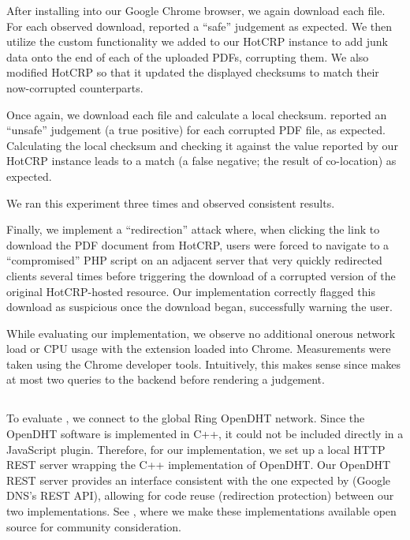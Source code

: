 After installing \DNSSYS{} into our Google Chrome browser, we again download
each file. For each observed download, \DNSSYS{} reported a ``safe'' judgement
as expected. We then utilize the custom functionality we added to our HotCRP
instance to add junk data onto the end of each of the uploaded PDFs, corrupting
them. We also modified HotCRP so that it updated the displayed checksums to
match their now-corrupted counterparts.

Once again, we download each file and calculate a local checksum. \DNSSYS{}
reported an ``unsafe'' judgement (a true positive) for each corrupted PDF file,
as expected. Calculating the local checksum and checking it against the value
reported by our HotCRP instance leads to a match (a false negative; \ie the
result of co-location) as expected.

We ran this experiment three times and observed consistent results.

Finally, we implement a ``redirection'' attack where, when clicking the link to
download the PDF document from HotCRP, users were forced to navigate to a
``compromised'' PHP script on an adjacent server that very quickly redirected
clients several times before triggering the download of a corrupted version of
the original HotCRP-hosted resource. Our implementation correctly flagged this
download as suspicious once the download began, successfully warning the user.

While evaluating our implementation, we observe no additional onerous network
load or CPU usage with the extension loaded into Chrome. Measurements were taken
using the Chrome developer tools. Intuitively, this makes sense since \DNSSYS{}
makes at most two queries to the backend before rendering a judgement.

\subsection{\DHTSYS{}}

To evaluate \DHTSYS{}, we connect to the global Ring OpenDHT network. Since the
OpenDHT software is implemented in C++, it could not be included directly in a
JavaScript plugin. Therefore, for our implementation, we set up a local HTTP
REST server wrapping the C++ implementation of OpenDHT. Our OpenDHT REST server
provides an interface consistent with the one expected by \DNSSYS{} (\ie Google
DNS's REST API), allowing for code reuse (\eg redirection protection) between
our two implementations. See , where we make these
implementations available open source for community consideration.

